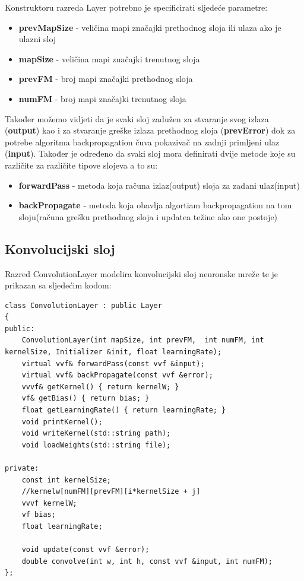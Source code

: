 \documentclass[times, utf8, zavrsni]{fer}
\begin{document}
Konstruktoru razreda Layer potrebno je specificirati sljedeće parametre:
\begin{itemize}
\item \textbf{prevMapSize} - veličina mapi značajki prethodnog sloja ili ulaza ako je ulazni sloj
\item \textbf{mapSize} - veličina mapi značajki trenutnog sloja
\item \textbf{prevFM} - broj mapi značajki prethodnog sloja
\item \textbf{numFM} - broj mapi značajki trenutnog sloja
\end{itemize}

Također možemo vidjeti da je svaki sloj zadužen za stvaranje svog izlaza (\textbf{output}) kao i za stvaranje greške izlaza prethodnog sloja (\textbf{prevError}) dok za potrebe algoritma backpropagation čuva pokazivač na zadnji primljeni ulaz (\textbf{input}). Također je određeno da svaki sloj mora definirati dvije metode koje su različite za različite tipove slojeva a to su:
\begin{itemize}
\item \textbf{forwardPass} - metoda koja računa izlaz(output) sloja za zadani ulaz(input)
\item \textbf{backPropagate} - metoda koja obavlja algortiam backpropagation na tom sloju(računa grešku prethodnog sloja i updatea težine ako one postoje)
\end{itemize}

\subsection{Konvolucijski sloj}
Razred ConvolutionLayer modelira konvolucijski sloj neuronske mreže te je prikazan sa sljedećim kodom:
\begin{lstlisting}[caption=Razred ConvolutionLayer,
  label=ConvLayer]
class ConvolutionLayer : public Layer
{
public:
    ConvolutionLayer(int mapSize, int prevFM,  int numFM, int kernelSize, Initializer &init, float learningRate); 
    virtual vvf& forwardPass(const vvf &input);
    virtual vvf& backPropagate(const vvf &error);
    vvvf& getKernel() { return kernelW; }
    vf& getBias() { return bias; }
    float getLearningRate() { return learningRate; }
    void printKernel();
    void writeKernel(std::string path);
    void loadWeights(std::string file);

private:
    const int kernelSize;
    //kernelw[numFM][prevFM][i*kernelSize + j]
    vvvf kernelW;
    vf bias;
    float learningRate;

    void update(const vvf &error);
    double convolve(int w, int h, const vvf &input, int numFM);
};
\end{lstlisting}
\end{document}
